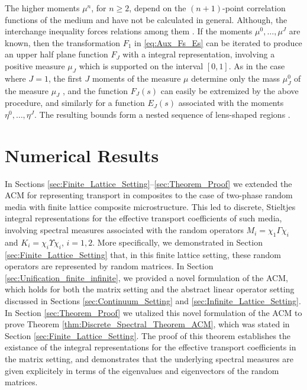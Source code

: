 \documentclass{cmslatex}
\begin{document}
The higher moments $\mu^n$, for $n\geq2$, depend on the $(n+1)$-point
correlation functions of the medium \cite{Golden:CMP-473} and have not
be calculated in general. Although, the interchange inequality forces
relations among them \cite{Milton:JAP-5294}. If the moments
$\mu^0,\ldots,\mu^J$ are known, then the transformation $F_1$ in
\eqref{eq:Aux_Fs_Es} can be iterated to produce an upper half plane
function $F_J$ with a integral representation, involving a positive
measure $\mu_J$ which is supported on the interval $[0,1]$. As in the
case where $J=1$, the first $J$ moments of the measure $\mu$ determine
only the mass $\mu_J^0$ of the measure $\mu_J$ \cite{Golden:JMPS-333}, and
the function $F_J(s)$ can easily be extremized by the above procedure,
and similarly for a function $E_J(s)$ associated with the moments
$\eta^0,\ldots,\eta^J$. The resulting bounds form a nested sequence of
lens-shaped regions \cite{Golden:JMPS-333}.




\section{Numerical Results}\label{sec:Numerical_Results}
%
In Sections \ref{sec:Finite_Lattice_Setting}--\ref{sec:Theorem_Proof}
we extended the ACM for representing transport in composites
to the case of two-phase random media with finite lattice composite 
microstructure. This led to discrete, Stieltjes integral
representations for the effective transport coefficients of such
media, involving spectral measures associated with the random
operators $M_i=\chi_1\Gamma\chi_i$ and $K_i=\chi_i\Upsilon\chi_i$, $i=1,2$. More specifically,
we demonstrated in Section \ref{sec:Finite_Lattice_Setting} that, in
this finite lattice setting, these random operators are represented by
random matrices. In Section \ref{sec:Unification_finite_infinite}, we
provided a novel formulation of the ACM, which holds for both the
matrix setting and the abstract linear operator setting discussed in
Sections \ref{sec:Continuum_Setting} and
\ref{sec:Infinite_Lattice_Setting}. In Section \ref{sec:Theorem_Proof}
we utalized this novel formulation of the ACM to prove Theorem 
\ref{thm:Discrete_Spectral_Theorem_ACM}, which was stated in Section  
\ref{sec:Finite_Lattice_Setting}. The proof of this theorem
establishes the existance of the integral representations for the
effective transport coefficients in the matrix setting, and
demonstrates that the underlying spectral measures are given
explicitely in terms of the eigenvalues and eigenvectors of the random
matrices. 
\end{document}
